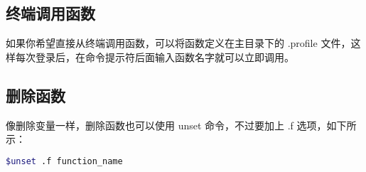 \subsection{终端调用函数}
如果你希望直接从终端调用函数，可以将函数定义在主目录下的 .profile 文件，这样每次登录后，在命令提示符后面输入函数名字就可以立即调用。






\subsection{删除函数}
像删除变量一样，删除函数也可以使用 unset 命令，不过要加上 .f 选项，如下所示：
\begin{lstlisting}[language=sh]
$unset .f function_name
\end{lstlisting}


